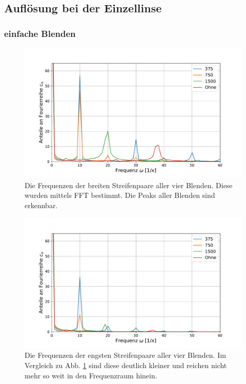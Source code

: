 	\subsection{Auflösung bei der Einzellinse}

		\subsubsection{einfache Blenden}
						
			\begin{figure}[ht]
				\centering
				\includegraphics[width=1\textwidth]{data/FFTLinie1.pdf}
				\caption{Die Frequenzen der breiten Streifenpaare aller vier Blenden. Diese wurden mittels FFT bestimmt. Die Peaks aller Blenden sind erkennbar.}
				\label{fig:FFT1}
			\end{figure}
			
			\begin{figure}[ht]
				\centering
				\includegraphics[width=1\textwidth]{data/FFTLinie4.pdf}
				\caption{Die Frequenzen der engsten Streifenpaare aller vier Blenden. Im Vergleich zu Abb. \ref{fig:FFT1} sind diese deutlich kleiner und reichen nicht mehr so weit in den Frequenzraum hinein.}
				\label{fig:FFT2}	
			\end{figure}
			
